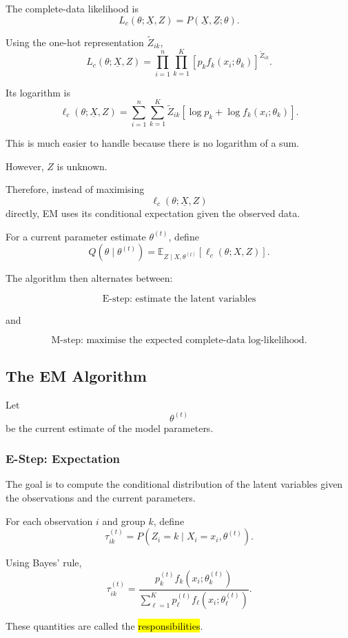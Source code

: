 The complete-data likelihood is
\[
L_c(\theta;\underline{X},Z)
=
P(\underline{X},\underline{Z};\theta).
\]

Using the one-hot representation $\tilde Z_{ik}$,
\[
L_c(\theta;\underline{X},Z)
=
\prod_{i=1}^n
\prod_{k=1}^K
\left[
p_kf_k(x_i;\theta_k)
\right]^{\tilde Z_{ik}}.
\]

Its logarithm is
\[
\ell_c(\theta;\underline{X},Z)
=
\sum_{i=1}^n
\sum_{k=1}^K
\tilde Z_{ik}
\left[
\log p_k+\log f_k(x_i;\theta_k)
\right].
\]

This is much easier to handle because there is no logarithm of a sum.

However, $Z$ is unknown.

Therefore, instead of maximising
\[
\ell_c(\theta;\underline{X},Z)
\]
directly, EM uses its conditional expectation given the observed data.

For a current parameter estimate $\theta^{(t)}$, define
\[
Q(\theta\mid\theta^{(t)})
=
\mathbb{E}_{Z\mid X,\theta^{(t)}}
\left[
\ell_c(\theta;X,Z)
\right].
\]

The algorithm then alternates between:

\[
\boxed{
\text{E-step: estimate the latent variables}
}
\]

and

\[
\boxed{
\text{M-step: maximise the expected complete-data log-likelihood}
}.
\]

\subsection{The EM Algorithm}

Let
\[
\theta^{(t)}
\]
be the current estimate of the model parameters.

\subsubsection{E-Step: Expectation}

The goal is to compute the conditional distribution of the latent
variables given the observations and the current parameters.

For each observation $i$ and group $k$, define
\[
\tau_{ik}^{(t)}
=
P(Z_i=k\mid X_i=x_i,\theta^{(t)}).
\]

Using Bayes' rule,
\[
\tau_{ik}^{(t)}
=
\frac{
p_k^{(t)}
f_k(x_i;\theta_k^{(t)})
}{
\sum_{\ell=1}^K
p_\ell^{(t)}
f_\ell(x_i;\theta_\ell^{(t)})
}.
\]

These quantities are called the
\hl{responsibilities}.

